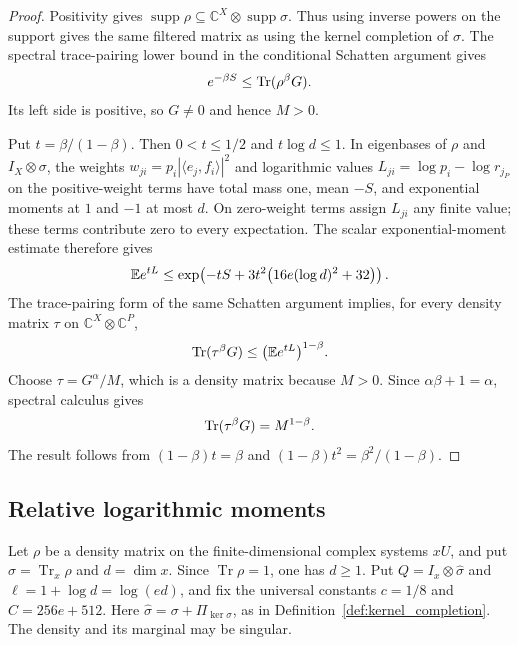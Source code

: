 \begin{proof}\leanok
    Positivity gives
    $\operatorname{supp}\rho\subseteq
    \mathbb C^X\otimes\operatorname{supp}\sigma$.
    Thus using inverse powers on the support gives the same filtered
    matrix as using the kernel completion of $\sigma$.
    The spectral trace-pairing lower bound in the conditional Schatten
    argument gives
    \begin{align}
        e^{-\beta S}\le\operatorname{Tr}(\rho^\beta G).\notag
    \end{align}
    Its left side is positive, so $G\ne0$ and hence $M>0$.

    Put $t=\beta/(1-\beta)$. Then $0<t\le1/2$ and $t\log d\le1$.
    In eigenbases of $\rho$ and $I_X\otimes\sigma$, the weights
    $w_{ji}=p_i|\langle e_j,f_i\rangle|^2$ and logarithmic values
    $L_{ji}=\log p_i-\log r_{j_P}$ on the positive-weight terms have
    total mass one, mean $-S$, and exponential moments at $1$ and $-1$
    at most $d$. On zero-weight terms assign $L_{ji}$ any finite value;
    these terms contribute zero to every expectation.
    The scalar exponential-moment estimate therefore gives
    \begin{align}
        \mathbb E e^{tL}
        \le\exp\!\left(-tS+3t^2
            \bigl(16e(\log d)^2+32\bigr)\right).\notag
    \end{align}
    The trace-pairing form of the same Schatten argument implies, for
    every density matrix $\tau$ on $\mathbb C^X\otimes\mathbb C^P$,
    \begin{align}
        \operatorname{Tr}(\tau^\beta G)
        \le\bigl(\mathbb E e^{tL}\bigr)^{1-\beta}.\notag
    \end{align}
    Choose $\tau=G^\alpha/M$, which is a density matrix because $M>0$.
    Since $\alpha\beta+1=\alpha$, spectral calculus gives
    \begin{align}
        \operatorname{Tr}(\tau^\beta G)=M^{1-\beta}.\notag
    \end{align}
    The result follows from $(1-\beta)t=\beta$ and
    $(1-\beta)t^2=\beta^2/(1-\beta)$.
\end{proof}

\subsection{Relative logarithmic moments}
\label{sec:conditional_relative_log_moments}

Let $\rho$ be a density matrix on the finite-dimensional complex systems
$xU$, and put $\sigma=\operatorname{Tr}_x\rho$ and $d=\dim x$.
Since $\operatorname{Tr}\rho=1$, one has $d\ge1$.
Put $Q=I_x\otimes\widehat\sigma$ and $\ell=1+\log d=\log(ed)$,
and fix the universal constants $c=1/8$ and $C=256e+512$.
Here $\widehat\sigma=\sigma+\Pi_{\ker\sigma}$, as in
Definition~\ref{def:kernel_completion}. The density and its marginal may
be singular.

